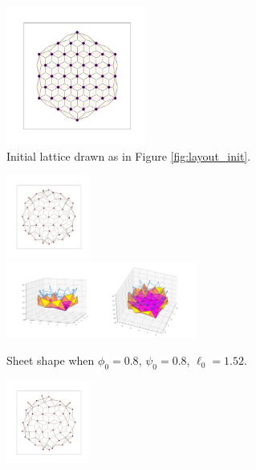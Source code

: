 \begin{figure}[htbp]
    \centering
    \begin{subfigure}[b]{\textwidth}
        \centering
        \includegraphics[width=0.5\textwidth]{hexbig/hexbig_graph.png}
        \caption{Initial lattice drawn as in Figure \ref{fig:layout_init}.}
        \label{subfig:hexbig_graph}
    \end{subfigure}
    \begin{subfigure}[b]{\textwidth}
        \centering
        \includegraphics[width=0.3\textwidth]{hexbig/hexbig0.8_0.8_1.35_10_graph.png}
        \includegraphics[width=0.69\textwidth]{hexbig/hexbig0.8_0.8_1.35_10_plot.png}
        \caption{Sheet shape when $\phi_0=0.8$, $\psi_0=0.8$, $\ell_0=1.52$.}
        \label{subfig:hexbig_in}
    \end{subfigure}
    \begin{subfigure}[b]{\textwidth}
        \centering
        \includegraphics[width=0.3\textwidth]{hexbig/hexbig0.95_0.8_1.35_10_graph.png}

\end{subfigure}
\end{figure}
